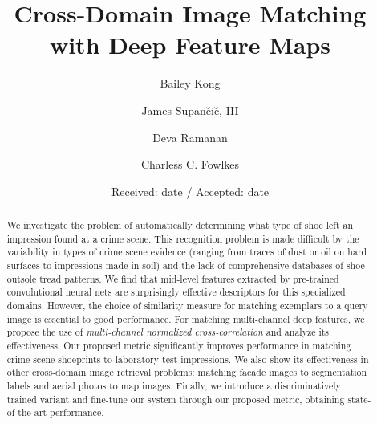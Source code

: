 \documentclass[twocolumn]{svjour3}           %
\begin{document}
\title{Cross-Domain Image Matching with Deep Feature Maps}


\author{Bailey Kong \and
        James Supan\u{c}i\u{c}, III \and
        Deva Ramanan \and
        Charless C. Fowlkes
}



\date{Received: date / Accepted: date}


\maketitle

\begin{abstract}
  We investigate the problem of automatically determining what type of shoe
  left an impression found at a crime scene. This recognition problem is made
  difficult by the variability in types of crime scene evidence (ranging from
  traces of dust or oil on hard surfaces to impressions made in soil) and the
  lack of comprehensive databases of shoe outsole tread patterns.  We find that
  mid-level features extracted by pre-trained convolutional neural nets are
  surprisingly effective descriptors for this specialized domains. However,
  the choice of similarity measure for matching exemplars to a query image is
  essential to good performance. For matching multi-channel deep features, we
  propose the use of \emph{multi-channel normalized cross-correlation} and
  analyze its effectiveness.  Our proposed metric significantly improves
  performance in matching crime scene shoeprints to laboratory test
  impressions. We also show its effectiveness in other cross-domain image
  retrieval problems: matching facade images to segmentation labels and aerial
  photos to map images.  Finally, we introduce a discriminatively trained
  variant and fine-tune our system through our proposed metric, obtaining
  state-of-the-art performance.
\end{abstract}
\end{document}
